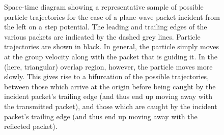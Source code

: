 \documentclass[aps,prc,onecolumn,letterpaper,floatfix,12pt]{revtex4}
\begin{document}
\begin{figure}[t]
\begin{center}
\caption{
Space-time diagram showing a
representative sample of possible particle trajectories for the case
of a plane-wave packet incident from the left on a step potential.
The leading and trailing edges of the various packets are indicated by
the dashed grey lines.  Particle trajectories are shown in black.  In 
general, the particle simply moves at the group velocity along with
the packet that is guiding it.  In the (here, triangular) overlap
region, however, the particle moves more slowly.  This gives rise to a
bifurcation of the possible trajectories, between those which arrive at the
origin before being caught by the incident packet's trailing edge
(and thus end up moving away with the transmitted packet), and those
which are caught by the incident packet's trailing edge (and thus end
up moving away with the reflected packet).  
\label{fig2}
}
\end{center}
\end{figure}
\end{document}

